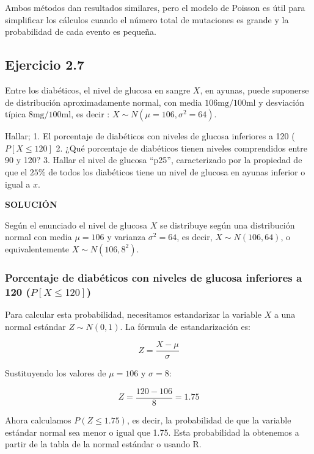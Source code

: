 \documentclass[
]{article}
\begin{document}
Ambos métodos dan resultados similares, pero el modelo de Poisson es útil para simplificar los cálculos cuando el número total de mutaciones es grande y la probabilidad de cada evento es pequeña.

\subsection{Ejercicio 2.7}\label{ejercicio-2.7}

Entre los diabéticos, el nivel de glucosa en sangre \(X\), en ayunas, puede suponerse de distribución aproximadamente normal, con media \(106 \mathrm{mg} / 100 \mathrm{ml}\) y desviación típica \(8 \mathrm{mg} / 100 \mathrm{ml}\), es decir : \(X \sim N\left(\mu=106, \sigma^{2}=64\right)\).

Hallar;
1. El porcentaje de diabéticos con niveles de glucosa inferiores a 120 ( \(P[X \leq 120]\)
2. ¿Qué porcentaje de diabéticos tienen niveles comprendidos entre 90 y 120?
3. Hallar el nivel de glucosa ``p25'', caracterizado por la propiedad de que el \(25 \%\) de todos los diabéticos tiene un nivel de glucosa en ayunas inferior o igual a \(x\).

\textbf{SOLUCIÓN}

Según el enunciado el nivel de glucosa \(X\) se distribuye según una distribución normal con media \(\mu = 106\) y varianza \(\sigma^2 = 64\), es decir, \(X \sim N(106, 64)\), o equivalentemente \(X \sim N(106, 8^2)\).

\subsubsection{\texorpdfstring{Porcentaje de diabéticos con niveles de glucosa inferiores a 120 (\(P[X \leq 120]\))}{Porcentaje de diabéticos con niveles de glucosa inferiores a 120 (P{[}X \textbackslash leq 120{]})}}\label{porcentaje-de-diabuxe9ticos-con-niveles-de-glucosa-inferiores-a-120-px-leq-120}

Para calcular esta probabilidad, necesitamos estandarizar la variable \(X\) a una normal estándar \(Z \sim N(0, 1)\). La fórmula de estandarización es:

\[ Z = \frac{X - \mu}{\sigma} \]

Sustituyendo los valores de \(\mu = 106\) y \(\sigma = 8\):

\[ Z = \frac{120 - 106}{8} = 1.75 \]

Ahora calculamos \(P(Z \leq 1.75)\), es decir, la probabilidad de que la variable estándar normal sea menor o igual que 1.75. Esta probabilidad la obtenemos a partir de la tabla de la normal estándar o usando R.
\end{document}
